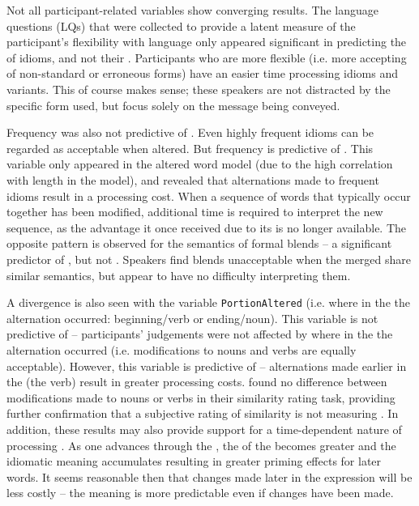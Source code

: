 \documentclass[output=paper
,modfonts
,nonflat]{langsci/langscibook}
\begin{document}
Not all participant-related variables show converging results. The language questions (LQs) that were collected to provide a latent measure of the participant's flexibility with language only appeared significant in predicting the  of idioms, and not their . Participants who are more flexible (i.e. more accepting of non-standard or erroneous forms) have an easier time processing idioms and variants. This of course makes sense; these speakers are not distracted by the specific form used, but focus solely on the message being conveyed.  

Frequency was also not predictive of . Even highly frequent idioms can be regarded as acceptable when altered. But frequency is predictive of . This variable only appeared in the altered word model (due to the high correlation with length in the  model), and revealed that alternations made to frequent idioms result in a processing cost. When a sequence of words that typically occur together has been modified, additional time is required to interpret the new sequence, as the advantage it once received due to its  is no longer available. The opposite pattern is observed for the semantics of formal  blends  -- a significant predictor of , but not . Speakers find blends unacceptable when the merged  share similar semantics, but appear to have no difficulty interpreting them.

A divergence is also seen with the variable \texttt{PortionAltered} (i.e. where in the  the alternation occurred: beginning/verb or ending/noun). This variable is not predictive of  -- participants' judgements were not affected by where in the  the alternation occurred (i.e. modifications to nouns and verbs are equally acceptable). However, this variable is predictive of  -- alternations made earlier in the  (the verb) result in greater processing costs. \citet{GibbsEtAl1989} found no difference between modifications made to nouns or verbs in their similarity rating task, providing further confirmation that a subjective rating of similarity is not measuring . In addition, these results may also provide support for a time-dependent nature of  processing \citep{TitoneLibben2014}. As one advances through the , the  of the  becomes greater and the idiomatic meaning accumulates resulting in greater priming effects for later words. It seems reasonable then that changes made later in the expression will be less costly -- the meaning is more predictable even if changes have been made.
\end{document}
